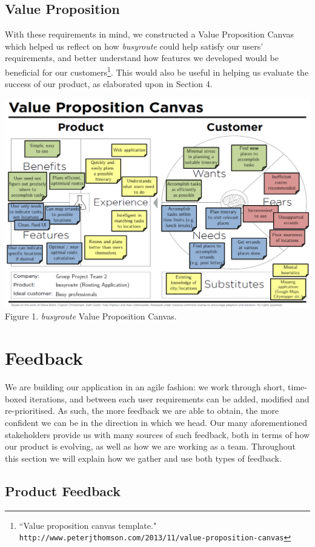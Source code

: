 \documentclass[a4paper, 10pt]{article}
\begin{document}
\subsection{Value Proposition}
With these requirements in mind, we constructed a Value Proposition Canvas which helped us reflect on how \textit{busyroute} could help satisfy our users' requirements, and better understand how features we developed would be beneficial for our customers\footnote{``Value proposition canvas template." \texttt{http://www.peterjthomson.com/2013/11/value-proposition-canvas}}. This would also be useful in helping us evaluate the success of our product, as elaborated upon in Section 4.
\begin{center}
\includegraphics[scale=0.66]{vpc.png} \\
Figure 1. \textit{busyroute} Value Proposition Canvas.
\end{center}

\section{Feedback}
We are building our application in an agile fashion: we work through short, time-boxed iterations, and between each user requirements can be added, modified and re-prioritised. As such, the more feedback we are able to obtain, the more confident we can be in the direction in which we head. Our many aforementioned stakeholders provide us with many sources of such feedback, both in terms of how our product is evolving, as well as how we are working as a team. Throughout this section we will explain how we gather and use both types of feedback.
\subsection{Product Feedback}
\end{document}
